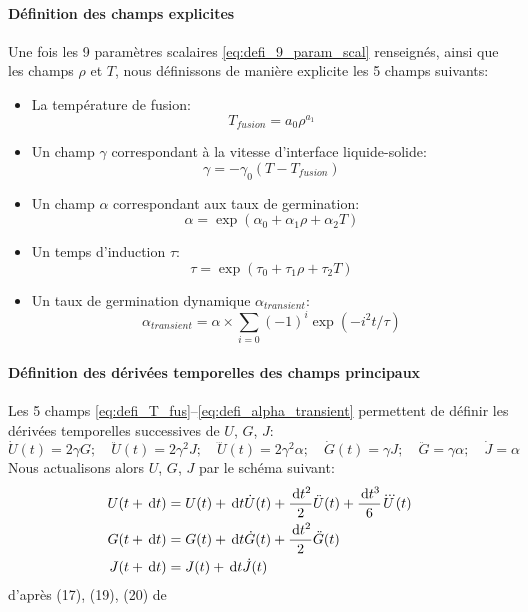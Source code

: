 \documentclass[10pt]{book}
\begin{document}
\paragraph{Définition des champs explicites} Une fois les 9 paramètres scalaires \eqref{eq:defi_9_param_scal} renseignés, ainsi que les champs $\rho$ et $T$, nous définissons de manière explicite les 5 champs suivants:
\begin{itemize}
\item La température de fusion:
\begin{equation}
T_{fusion} = a_{0}\rho^{a_{1}}
\label{eq:defi_T_fus}
\end{equation}
\item Un champ $\gamma$ correspondant à la vitesse d'interface liquide-solide:
\begin{equation}
\gamma = -\gamma_{0}(T-T_{fusion})
\label{eq:defi_vitesse_interface}
\end{equation}
\item Un champ $\alpha$ correspondant aux taux de germination:
\begin{equation}
\alpha = \exp\left(\alpha_{0}+\alpha_{1}\rho + \alpha_{2}T\right)
\label{eq:defi_taux_germination}
\end{equation}
\item Un temps d'induction $\tau$:
\begin{equation}
\tau = \exp\left(\tau_{0}+\tau_{1}\rho + \tau_{2}T\right)
\label{eq:defi_temps_induction}
\end{equation}
\item Un taux de germination dynamique $\alpha_{transient}$:
\begin{equation}
\alpha_{transient} = \alpha \times \sum_{i=0}(-1)^{i}\exp\left(-i^{2}t /\tau\right)
\label{eq:defi_alpha_transient}
\end{equation}
\end{itemize}
\paragraph{Définition des dérivées temporelles des champs principaux} Les 5 champs \eqref{eq:defi_T_fus}--\eqref{eq:defi_alpha_transient} permettent de définir les dérivées temporelles successives de $U$, $G$, $J$:
$$\dot{U}(t)= 2\gamma G; \quad \ddot{U}(t)=2\gamma^{2} J; \quad \dddot{U}(t)=2\gamma^{2}\alpha; \quad \dot{G}(t)=\gamma J; \quad \ddot{G}= \gamma\alpha; \quad \dot{J}= \alpha$$ 
Nous actualisons alors $U$, $G$, $J$ par le schéma suivant:
$$\begin{aligned}
U(t+\,\mathrm{d}t) &= U(t)+\,\mathrm{d}t\dot{U}(t)+\dfrac{\,\mathrm{d}t^{2}}{2}\ddot{U}(t)+\dfrac{\,\mathrm{d}t^{3}}{6}\dddot{U}(t)\\
G(t+\,\mathrm{d}t) &= G(t)+\,\mathrm{d}t\dot{G}(t)+\dfrac{\,\mathrm{d}t^{2}}{2}\ddot{G}(t)\\
J(t+\,\mathrm{d}t)&=J(t)+\,\mathrm{d}t\dot{J}(t)
\end{aligned}$$
d’après (17), (19), (20) de \cite{myint2020coupling}
\end{document}
